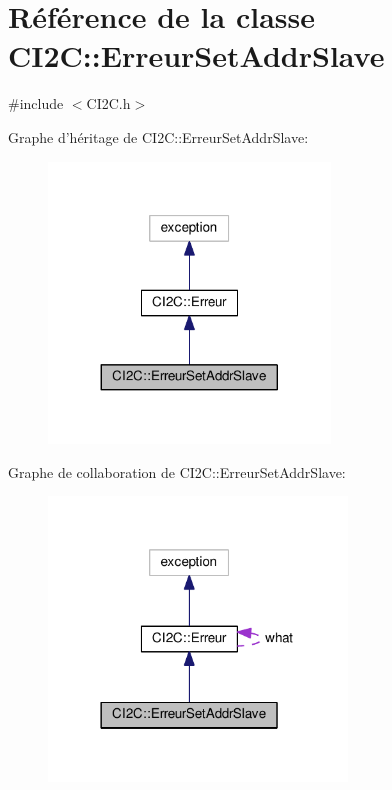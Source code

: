 \hypertarget{class_c_i2_c_1_1_erreur_set_addr_slave}{\section{Référence de la classe C\+I2\+C\+:\+:Erreur\+Set\+Addr\+Slave}
\label{class_c_i2_c_1_1_erreur_set_addr_slave}
}


{\ttfamily \#include $<$C\+I2\+C.\+h$>$}



Graphe d'héritage de C\+I2\+C\+:\+:Erreur\+Set\+Addr\+Slave\+:
\nopagebreak
\begin{figure}[H]
\begin{center}
\leavevmode
\includegraphics[width=212pt]{class_c_i2_c_1_1_erreur_set_addr_slave__inherit__graph}
\end{center}
\end{figure}


Graphe de collaboration de C\+I2\+C\+:\+:Erreur\+Set\+Addr\+Slave\+:
\nopagebreak
\begin{figure}[H]
\begin{center}
\leavevmode
\includegraphics[width=225pt]{class_c_i2_c_1_1_erreur_set_addr_slave__coll__graph}
\end{center}
\end{figure}
